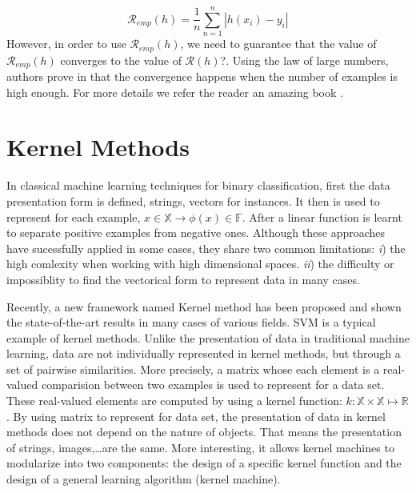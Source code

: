 \begin{equation}
\mathcal{R}_{emp}(h) = \frac{1}{n} \sum_{n=1}^{n} |h(x_i) - y_i| 
\end{equation}
However, in order to use $\mathcal{R}_{emp}(h)$, we need to guarantee that the value of $\mathcal{R}_{emp}(h)$ converges to the value of $\mathcal{R}(h)$?. Using the law of large numbers, authors prove in \cite{vapnik1998statistical} that the convergence happens when the number of examples is high enough. For more details we refer the reader an amazing book \cite{vapnik1998statistical}.
\section{Kernel Methods}
\label{kernel-methods}
In classical machine learning techniques for binary classification, first the data presentation form is defined, strings, vectors for instances. It then is used to represent for each example, $x\in\mathbb{X} \longrightarrow \phi(x) \in \mathbb{F}$. After a linear function is learnt to separate positive examples from negative ones. Although these approaches have sucessfully applied in some cases, they share two common limitations: \textit{i}) the high comlexity when working with high dimensional spaces. \textit{ii}) the difficulty or impossiblity to find the vectorical form to represent data in many cases.

Recently, a new framework named Kernel method has been proposed and shown the state-of-the-art results in many cases of various fields. SVM \cite{cortes1995support} is a typical example of kernel methods. Unlike the presentation of data in traditional machine learning, data are not individually represented in kernel methods, but through a set of pairwise similarities. More precisely, a matrix whose each element is a real-valued comparision between two examples is used to represent for a data set. These real-valued elements are computed by using a kernel function: $k: \mathbb{X} \times \mathbb{X} \longmapsto \mathbb{R}$. By using matrix to represent for data set, the presentation of data in kernel methods does not depend on the nature of objects. That means the presentation of strings, images,\ldots are the same. More interesting, it allows kernel machines to modularize into two components: the design of a specific kernel function and the design of a general learning algorithm (kernel machine).
